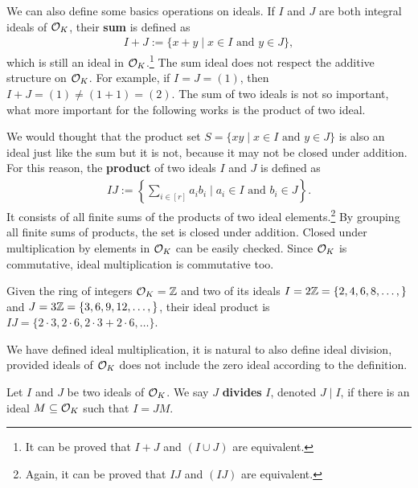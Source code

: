 \documentclass[../main.tex]{subfiles}
\begin{document}
We can also define some basics operations on ideals. If $I$ and $J$ are both integral ideals of $\mathcal{O}_K$, their 
\reversemarginpar
{}
\textbf{sum} is defined as 
\begin{align*}
    I + J := \{x + y \mid x \in I \text{ and } y \in J\},
\end{align*}
which is still an ideal in $\mathcal{O}_K$.\footnote{It can be proved that $I+J$ and $(I \cup J)$ are equivalent.} The sum ideal does not respect the additive structure on $\mathcal{O}_K$. For example, if $I = J = (1)$, then $I+J= (1) \neq (1+1) = (2)$. The sum of two ideals is not so important, what more important for the following works is the product of two ideal. 
	
We would thought that the product set $S=\{xy \mid x \in I \text{ and } y \in J\}$ is also an ideal just like the sum but it is not, because it may not be closed under addition. For this reason, 
\reversemarginpar
{}
the \textbf{product} of two ideals $I$ and $J$ is defined as 
\begin{align*}
    IJ := \left\{\sum_{i \in [r]} a_i b_i \mid a_i \in I \text{ and } b_i \in J\right\}. 
\end{align*}
It consists of all finite sums of the products of two ideal elements.\footnote{Again, it can be proved that $IJ$ and $(IJ)$ are equivalent.} 
By grouping all finite sums of products, the set is closed under addition. Closed under multiplication by elements in $\mathcal{O}_K$ can be easily checked. Since $\mathcal{O}_K$ is commutative, ideal multiplication is commutative too. 
	
\begin{example}
Given the ring of integers $\mathcal{O}_K = \mathbb{Z}$ and two of its ideals $I = 2\mathbb{Z} = \{2, 4,6,8,\dots,\}$ and $J = 3\mathbb{Z}=\{3,6,9,12,\dots,\}$, their ideal product is $IJ=\{2\cdot 3, 2\cdot 6,2\cdot 3 + 2\cdot 6,\dots\}$.  
\end{example}
	 

We have defined ideal multiplication, it is natural to also define ideal division, provided ideals of $\mathcal{O}_K$ does not include the zero ideal according to the definition.  

\begin{definition}
Let $I$ and $J$ be two ideals of $\mathcal{O}_K$. We say 
\reversemarginpar
{}
$J$ \textbf{divides} $I$, denoted $J \mid I$, if there is an ideal $M \subseteq \mathcal{O}_K$ such that $I = JM$.
\end{definition}
\end{document}
